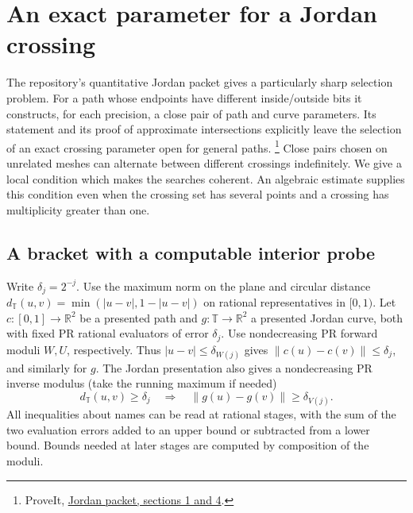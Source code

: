\section{An exact parameter for a Jordan crossing}\label{sec:crossing}

The repository's quantitative Jordan packet gives a particularly sharp
selection problem. For a path whose endpoints have different inside/outside
bits it constructs, for each precision, a close pair of path and curve
parameters. Its statement and its proof of approximate intersections explicitly
leave the selection of an exact crossing parameter open for general paths.%
\footnote{ProveIt, \href{https://github.com/VladimirReshetnikov/ProveIt/tree/5f3be02388442f16487d2dc5c2529961dd783d2b/Logic/PrimitiveRecursiveArithmetic/docs/proofs/topology/jordan_ipra_constructive_2026-11-15/sections}{Jordan packet, sections 1 and 4}.}
Close pairs chosen on unrelated meshes can alternate between different
crossings indefinitely. We give a local condition which makes the searches
coherent. An algebraic estimate supplies this condition even when the crossing
set has several points and a crossing has multiplicity greater than one.

\subsection{A bracket with a computable interior probe}

Write $\delta_j=2^{-j}$. Use the maximum norm on the plane and circular
distance $d_{\mathbb T}(u,v)=\min(|u-v|,1-|u-v|)$ on rational
representatives in $[0,1)$. Let $c:[0,1]\to\mathbb R^2$ be a presented
path and $g:\mathbb T\to\mathbb R^2$ a presented Jordan curve, both with
fixed PR rational evaluators of error $\delta_j$. Use nondecreasing PR
forward moduli $W,U$, respectively. Thus $|u-v|\le\delta_{W(j)}$
gives $\|c(u)-c(v)\|\le\delta_j$, and similarly for $g$. The Jordan
presentation also gives a nondecreasing PR inverse modulus (take the running
maximum if needed)
\[
 d_{\mathbb T}(u,v)\ge\delta_j
 \quad\Longrightarrow\quad \|g(u)-g(v)\|\ge\delta_{V(j)}.
\]
All inequalities about names can be read at rational stages, with the sum
of the two evaluation errors added to an upper bound or subtracted from
a lower bound. Bounds needed at later stages are computed by composition
of the moduli.

